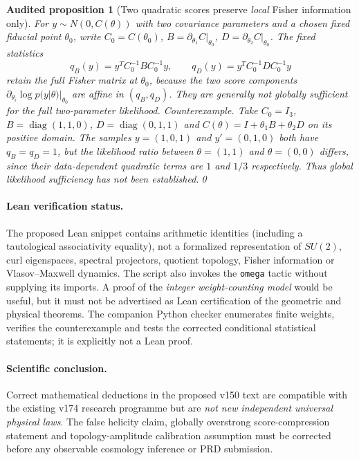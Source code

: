 \documentclass[aps,prd,onecolumn,notitlepage,groupedaddress,11pt]{revtex4-2}
\newtheorem{auditprop}{Audited proposition}[section]
\begin{document}
\begin{auditprop}[Two quadratic scores preserve \emph{local} Fisher information only]\label{audit:local-score}
For $y\sim N(0,C(\theta))$ with two covariance parameters and a chosen fixed fiducial point $\theta_0$, write $C_0=C(\theta_0)$, $B=\partial_{\theta_1}C|_{\theta_0}$, $D=\partial_{\theta_2}C|_{\theta_0}$. The fixed statistics
\begin{equation}\label{audit:q}
q_B(y)=y^TC_0^{-1}BC_0^{-1}y,\qquad q_D(y)=y^TC_0^{-1}DC_0^{-1}y
\end{equation}
retain the full Fisher matrix \emph{at $\theta_0$}, because the two score components $\partial_{\theta_i}\log p(y|\theta)|_{\theta_0}$ are affine in $(q_B,q_D)$. They are generally \emph{not globally sufficient} for the full two-parameter likelihood. \emph{Counterexample.} Take $C_0=I_3$, $B=\operatorname{diag}(1,1,0)$, $D=\operatorname{diag}(0,1,1)$ and $C(\theta)=I+\theta_1B+\theta_2D$ on its positive domain. The samples $y=(1,0,1)$ and $y'=(0,1,0)$ both have $q_B=q_D=1$, but the likelihood ratio between $\theta=(1,1)$ and $\theta=(0,0)$ differs, since their data-dependent quadratic terms are $1$ and $1/3$ respectively. Thus global likelihood sufficiency has not been established.\qed
\end{auditprop}

\paragraph{Lean verification status.} The proposed Lean snippet contains arithmetic identities (including a tautological associativity equality), not a formalized representation of $SU(2)$, curl eigenspaces, spectral projectors, quotient topology, Fisher information or Vlasov--Maxwell dynamics. The script also invokes the \texttt{omega} tactic without supplying its imports. A proof of the \emph{integer weight-counting model} would be useful, but it must not be advertised as Lean certification of the geometric and physical theorems. The companion Python checker enumerates finite weights, verifies the counterexample and tests the corrected conditional statistical statements; it is explicitly not a Lean proof.

\paragraph{Scientific conclusion.} Correct mathematical deductions in the proposed v150 text are compatible with the existing v174 research programme but are \emph{not new independent universal physical laws}. The false helicity claim, globally overstrong score-compression statement and topology-amplitude calibration assumption must be corrected before any observable cosmology inference or PRD submission.
\end{document}
